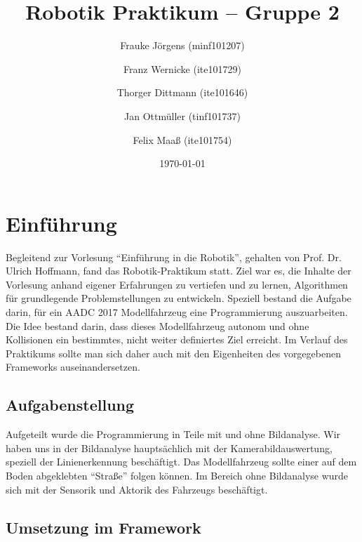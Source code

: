 \documentclass[a4paper,12pt]{report}
\begin{document}

	\title{Robotik Praktikum -- Gruppe 2}
	\author{Frauke Jörgens (minf101207) \and Franz Wernicke (ite101729) \and Thorger Dittmann (ite101646) \and Jan Ottmüller (tinf101737) \and Felix Maaß (ite101754)}
	\date{\today}
	\maketitle

	\tableofcontents


\chapter{Einführung}

	Begleitend zur Vorlesung ``Einführung in die Robotik'', gehalten von Prof. Dr. Ulrich Hoffmann, fand das Robotik-Praktikum statt. Ziel war es, die Inhalte der Vorlesung anhand eigener Erfahrungen zu vertiefen und zu lernen, Algorithmen für grundlegende Problemstellungen zu entwickeln. Speziell bestand die Aufgabe darin, für ein AADC 2017 Modellfahrzeug eine Programmierung auszuarbeiten. Die Idee bestand darin, dass dieses Modellfahrzeug autonom und ohne Kollisionen ein bestimmtes, nicht weiter definiertes Ziel erreicht. Im Verlauf des Praktikums sollte man sich daher auch mit den Eigenheiten des vorgegebenen Frameworks auseinandersetzen.
	
\section{Aufgabenstellung}
	Aufgeteilt wurde die Programmierung in Teile mit und ohne Bildanalyse. Wir haben uns in der Bildanalyse hauptsächlich mit der Kamerabildauswertung, speziell der Linienerkennung beschäftigt. Das Modellfahrzeug sollte einer auf dem Boden abgeklebten ``Straße'' folgen können. Im Bereich ohne Bildanalyse wurde sich mit der Sensorik und Aktorik des Fahrzeugs beschäftigt.\\
	
\section{Umsetzung im Framework}
	
\end{document}
